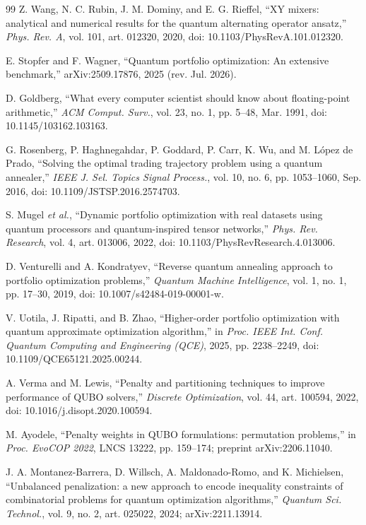 \documentclass[journal]{IEEEtran}
\begin{document}
\begin{thebibliography}{99}
 Z. Wang, N. C. Rubin, J. M. Dominy, and E. G. Rieffel, ``XY mixers: analytical and numerical results for the quantum alternating operator ansatz,'' \textit{Phys. Rev. A}, vol. 101, art. 012320, 2020, doi: 10.1103/PhysRevA.101.012320.

 E. Stopfer and F. Wagner, ``Quantum portfolio optimization: An extensive benchmark,'' arXiv:2509.17876, 2025 (rev. Jul. 2026).

 D. Goldberg, ``What every computer scientist should know about floating-point arithmetic,'' \textit{ACM Comput. Surv.}, vol. 23, no. 1, pp. 5--48, Mar. 1991, doi: 10.1145/103162.103163.

 G. Rosenberg, P. Haghnegahdar, P. Goddard, P. Carr, K. Wu, and M. L\'{o}pez de Prado, ``Solving the optimal trading trajectory problem using a quantum annealer,'' \textit{IEEE J. Sel. Topics Signal Process.}, vol. 10, no. 6, pp. 1053--1060, Sep. 2016, doi: 10.1109/JSTSP.2016.2574703.

 S. Mugel \textit{et al.}, ``Dynamic portfolio optimization with real datasets using quantum processors and quantum-inspired tensor networks,'' \textit{Phys. Rev. Research}, vol. 4, art. 013006, 2022, doi: 10.1103/PhysRevResearch.4.013006.

 D. Venturelli and A. Kondratyev, ``Reverse quantum annealing approach to portfolio optimization problems,'' \textit{Quantum Machine Intelligence}, vol. 1, no. 1, pp. 17--30, 2019, doi: 10.1007/s42484-019-00001-w.

 V. Uotila, J. Ripatti, and B. Zhao, ``Higher-order portfolio optimization with quantum approximate optimization algorithm,'' in \textit{Proc. IEEE Int. Conf. Quantum Computing and Engineering (QCE)}, 2025, pp. 2238--2249, doi: 10.1109/QCE65121.2025.00244.

 A. Verma and M. Lewis, ``Penalty and partitioning techniques to improve performance of QUBO solvers,'' \textit{Discrete Optimization}, vol. 44, art. 100594, 2022, doi: 10.1016/j.disopt.2020.100594.

 M. Ayodele, ``Penalty weights in QUBO formulations: permutation problems,'' in \textit{Proc. EvoCOP 2022}, LNCS 13222, pp. 159--174; preprint arXiv:2206.11040.

 J. A. Montanez-Barrera, D. Willsch, A. Maldonado-Romo, and K. Michielsen, ``Unbalanced penalization: a new approach to encode inequality constraints of combinatorial problems for quantum optimization algorithms,'' \textit{Quantum Sci. Technol.}, vol. 9, no. 2, art. 025022, 2024; arXiv:2211.13914.


\end{thebibliography}
\end{document}

